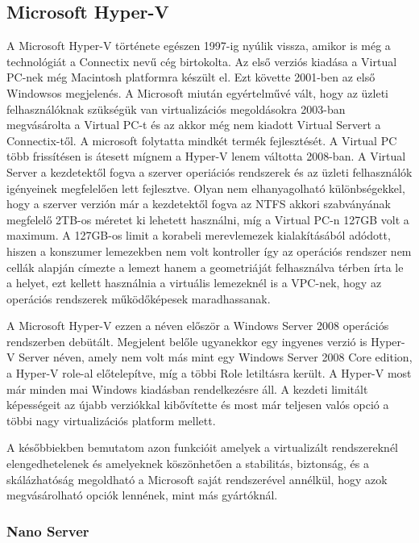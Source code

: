 \documentclass[12pt,oneside,justify,table]{book}
\begin{document}
\subsection{Microsoft Hyper-V\texttrademark}

A Microsoft Hyper-V története egészen 1997-ig nyúlik vissza, amikor is még a technológiát a Connectix nevű cég birtokolta. 
Az első verziós kiadása a Virtual PC-nek még Macintosh platformra készült el. 
Ezt követte 2001-ben az első Windowsos megjelenés. 
A Microsoft miután egyértelművé vált, hogy az üzleti felhasználóknak szükségük van virtualizációs megoldásokra 2003-ban megvásárolta a Virtual PC-t és az akkor még nem kiadott Virtual Servert a Connectix-től. 
A microsoft folytatta mindkét termék fejlesztését. A Virtual PC több frissítésen is átesett mígnem a Hyper-V lenem váltotta 2008-ban. 
A Virtual Server a kezdetektől fogva a szerver operiációs rendszerek és az üzleti felhasználók igényeinek megfelelően lett fejlesztve. 
Olyan nem elhanyagolható különbségekkel, hogy a szerver verzión már a kezdetektől fogva az NTFS akkori szabványának megfelelő 2TB-os méretet ki lehetett használni, míg a Virtual PC-n 127GB volt a maximum. 
A 127GB-os limit a korabeli merevlemezek kialakításából adódott, hiszen a konszumer lemezekben nem volt kontroller így az operációs rendszer nem cellák alapján címezte a lemezt hanem a geometriáját felhasználva térben írta le a helyet, ezt kellett használnia a virtuális lemezeknél is a VPC-nek, hogy az operációs rendszerek működőképesek maradhassanak.

A Microsoft Hyper-V ezzen a néven először a Windows Server 2008 operációs rendszerben debütált. 
Megjelent belőle ugyanekkor egy ingyenes verzió is Hyper-V Server néven, amely nem volt más mint egy Windows Server 2008 Core edition, a Hyper-V role-al előtelepítve, míg a többi Role letiltásra került.
A Hyper-V most már minden mai Windows kiadásban rendelkezésre áll. A kezdeti limitált képességeit az újabb verziókkal kibővítette és most már teljesen valós opció a többi nagy virtualizációs platform mellett. 

A későbbiekben bemutatom azon funkcióit amelyek a virtualizált rendszereknél elengedhetelenek és amelyeknek köszönhetően a stabilitás, biztonság, és a skálázhatóság megoldható a Microsoft saját rendszerével annélkül, hogy azok megvásárolható opciók lennének, mint más gyártóknál.

\subsubsection{Nano Server}
\end{document}
